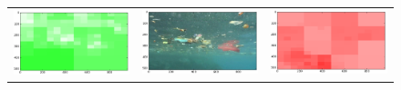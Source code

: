 \begin{figure}%
\centering
\ifx\showfig\undefined
\def\segwidth{.22\textwidth}
\begin{tabular}{ccc}

\includegraphics[keepaspectratio=true,width=\segwidth]{images/segment/6_01__animals__.png} &
\includegraphics[keepaspectratio=true,width=\segwidth]{images/segment/6_01__image__.png} &
\includegraphics[keepaspectratio=true,width=\segwidth]{images/segment/6_01__plastic__.png} \\


\end{tabular}
\end{figure}
